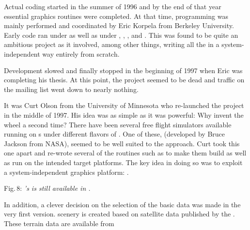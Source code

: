 Actual coding started in the summer of 1996 and by the end of that year essential
graphics routines were completed. At that time, programming was mainly performed and
coordinated by Eric Korpela from Berkeley University. Early code ran
under  as well as under , , ,
and . This was found to be quite an ambitious project as it involved, among
other things, writing all the  in a system-independent way
entirely from scratch.

Development slowed and finally stopped in the beginning of 1997 when Eric was completing
his thesis. At this point, the project seemed to be dead and traffic on the mailing list
went down to nearly nothing.

It was Curt Olson from the University of Minnesota who re-launched the
project in the middle of 1997. His idea was as simple as it was powerful: Why invent the
wheel a second time? There have been several free flight simulators available running on s under different flavors of
. One of these,  (developed by Bruce Jackson from NASA), seemed to be well suited to the approach. Curt took this one apart and
re-wrote several of the routines such as to make them build as well as run on the
intended target platforms. The key idea in doing so was to exploit a system-independent
graphics platform: .
\medskip

 \centerline{}

\smallskip
 \noindent
Fig.\,8: \textit{'s  is still available in \FlightGear.}
\medskip

In addition, a clever decision on the selection of the basic 
data was made in the very first version. \FlightGear{} scenery is created
based on satellite data published by the .
These terrain data are available from
 \medskip

